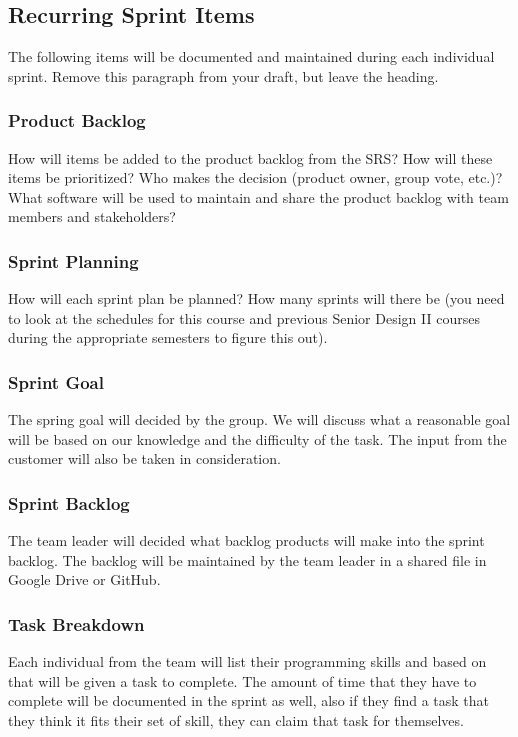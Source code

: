 \subsection{Recurring Sprint Items}
The following items will be documented and maintained during each individual sprint. Remove this paragraph from your draft, but leave the heading.

\subsubsection{Product Backlog}
How will items be added to the product backlog from the SRS? How will these items be prioritized? Who makes the decision (product owner, group vote, etc.)? What software will be used to maintain and share the product backlog with team members and stakeholders?

\subsubsection{Sprint Planning}
How will each sprint plan be planned? How many sprints will there be (you need to look at the schedules for this course and previous Senior Design II courses during the appropriate semesters to figure this out).

\subsubsection{Sprint Goal}
The spring goal will decided by the group. We will discuss what a reasonable goal will be based on our knowledge and the difficulty of the task. The input from the customer will also be taken in consideration.

\subsubsection{Sprint Backlog}
The team leader will decided what backlog products will make into the sprint backlog. The backlog will be maintained by the team leader in a shared file in Google Drive or GitHub.


\subsubsection{Task Breakdown}
Each individual from the team will list their programming skills and based on that will be given a task to complete. The amount of time that they have to complete will be documented in the sprint as well, also if they find a task that they think it fits their set of skill, they can claim that task for themselves.


